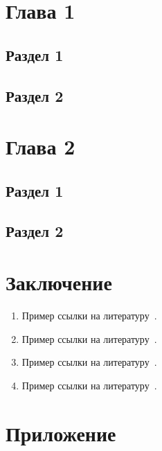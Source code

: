 \documentclass[14pt, oneside]{altsu-report}
\begin{document}

\chapter{Глава 1}
\section{Раздел 1}
\section{Раздел 2}

\chapter{Глава 2}
\section{Раздел 1}
\section{Раздел 2}

\chapter*{Заключение}

\begin{enumerate}
\item Пример ссылки на литературу~\cite{wikiRUBitbucket}.
\item Пример ссылки на литературу~\cite{wikiRUIdSoftware}.
\item Пример ссылки на литературу~\cite{wikiRUGitHub}.
\item Пример ссылки на литературу~\cite{felker2010android}.
\end{enumerate}

\newpage
{}
\printbibliography[title={Список использованной литературы}]

\newpage
\chapter*{Приложение}

\begin{code}
\label{code:pi-example}
\inputminted[mathescape,linenos,frame=lines,breaklines]{C}{src/pi-mpi.c}
\end{code}
\end{document}
